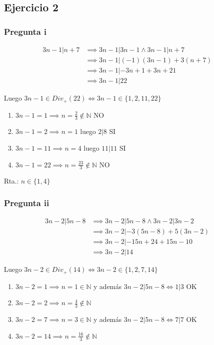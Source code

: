 \subsection{Ejercicio 2}
\subsubsection{Pregunta i}
\begin{align*}
    3n-1 | n+7 &\implies 3n-1 | 3n-1 \wedge 3n-1 | n+7  \\
    &\implies 3n-1 | (-1)(3n-1) + 3(n+7) \\
    &\implies 3n-1 | -3n+1+3n+21 \\
    &\implies 3n-1 | 22
\end{align*}

Luego $ 3n-1 \in Div_+(22) \iff 3n-1 \in \{ 1,2,11,22 \}$

\begin{enumerate}[label=(\alph*)]
    \item $ 3n-1 = 1 \implies n = \frac{2}{3} \not \in \mathbb{N}$ NO
    \item $ 3n-1 = 2 \implies n = 1 $ luego $ 2|8 $ SI 
    \item $ 3n-1 = 11 \implies n = 4 $ luego $ 11|11 $ SI 
    \item $ 3n-1 = 22 \implies n = \frac{23}{3} \not \in \mathbb{N} $ NO
\end{enumerate}

Rta.: $ n \in \{ 1,4 \} $

\subsubsection{Pregunta ii}
\begin{align*}
    3n-2 | 5n-8 &\implies 3n-2 | 5n-8 \wedge 3n-2 | 3n-2 \\
    &\implies 3n-2 | -3(5n-8) + 5(3n-2) \\
    &\implies 3n-2 | -15n + 24 + 15n - 10 \\
    &\implies 3n-2 | 14
\end{align*}

Luego $ 3n-2 \in Div_+(14) \iff 3n-2 \in \{ 1,2,7,14 \} $

\begin{enumerate}[label=(\alph*)]
    \item $ 3n-2 = 1 \implies n = 1 \in \mathbb{N}$ y además $3n-2 | 5n-8 \iff 1|3$ OK
    \item $ 3n-2 = 2 \implies n = \frac{4}{3} \not \in \mathbb{N}$
    \item $ 3n-2 = 7 \implies n = 3 \in \mathbb{N}$ y además $3n-2 | 5n-8 \iff 7|7$ OK
    \item $ 3n-2 = 14 \implies n = \frac{16}{3} \not \in \mathbb{N}$
\end{enumerate}

